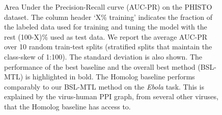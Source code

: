 \documentclass{bioinfo}
\begin{document}
\begin{figure}
{
\caption{Area Under the Precision-Recall curve (AUC-PR) on the PHISTO dataset. The column header `X\% training' indicates the fraction of the labeled data used for training and tuning the model with the rest (100-X)\% used as test data. We report the average AUC-PR over 10 random train-test splits (stratified splits that maintain the class-skew of 1:100). The standard deviation is also shown. The performance of the best baseline and the overall best method (BSL-MTL) is highlighted in bold. The Homolog baseline performs comparably to our BSL-MTL method on the \textit{Ebola} task. This is explained by the virus-human PPI graph, from several other viruses, that the Homolog baseline has access to.}
\label{resultsTable}
}


\end{figure}
\end{document}
